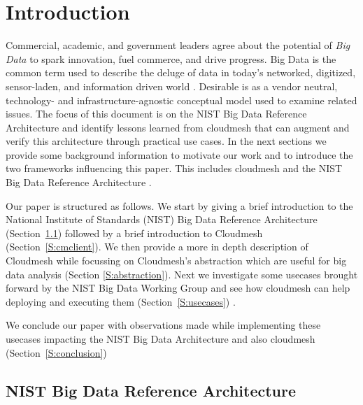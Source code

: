 \section{Introduction}

Commercial, academic, and government leaders agree about the potential
of {\em Big Data} to spark innovation, fuel commerce, and drive
progress. Big Data is the common term used to describe the deluge of
data in today’s networked, digitized, sensor-laden, and information
driven world \cite{nist-bd}. Desirable is as a vendor neutral,
technology- and infrastructure-agnostic conceptual model used to
examine related issues.  The focus of this document is on the NIST Big
Data Reference Architecture and identify lessons learned from
cloudmesh that can augment and verify this architecture through
practical use cases. In the next sections we provide some background
information to motivate our work and to introduce the two frameworks
influencing this paper. This includes cloudmesh \cite{las12-cloud}
\cite{github-cloudmesh-client} and the NIST Big Data Reference
Architecture \cite{nist-bd}.  

Our paper is structured as follows. We start by giving a brief
introduction to the National Institute of Standards (NIST) Big Data
Reference Architecture (Section~\ref{S:NBDarch}) followed by a brief
introduction to Cloudmesh (Section~\ref{S:cmclient}).  We then provide
a more in depth description of Cloudmesh while focussing on Cloudmesh's
abstraction which are useful for big data analysis (Section
\ref{S:abstraction}). Next we investigate some usecases brought
forward by the NIST Big Data Working Group and see how cloudmesh can
help deploying and executing them (Section~\ref{S:usecases}) .

We conclude our paper with observations made while implementing these
usecases impacting the NIST Big Data Architecture and also cloudmesh
(Section~\ref{S:conclusion})


\subsection{NIST Big Data Reference Architecture}
\label{S:NBDarch}

